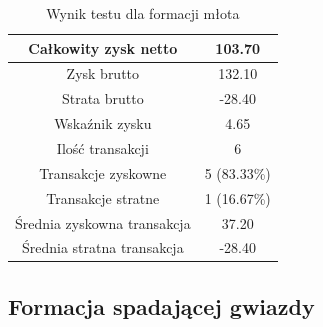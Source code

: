 \documentclass[pdflatex,11pt]{aghdpl}
\begin{document}
\begin{table}[h!]
\begin{center}
\begin{tabular}{|c|c|}
\hline 
Całkowity zysk netto & 103.70 \\
\hline
Zysk brutto & 132.10 \\
\hline
Strata brutto & -28.40 \\
\hline
Wskaźnik zysku & 4.65 \\
\hline
\hline
Ilość transakcji & 6 \\
\hline
Transakcje zyskowne & 5 (83.33\%) \\
\hline
Transakcje stratne & 1 (16.67\%) \\
\hline
\hline
Średnia zyskowna transakcja & 37.20 \\
\hline
Średnia stratna transakcja & -28.40 \\
\hline
\end{tabular} 
\caption{Wynik testu dla formacji młota}
\label{raport_mlot}
\end{center}
\end{table}

\subsection{Formacja spadającej gwiazdy}
\paragraph{}
\end{document}
